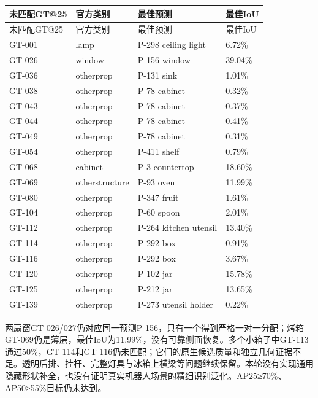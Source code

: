 \documentclass[UTF8,fontset=fandol]{ctexart}
\begin{document}
{\small
\begin{longtable}{|p{}|p{}|p{}|p{}|}
\hline
未匹配GT@25 & 官方类别 & 最佳预测 & 最佳IoU \\ \hline
\endfirsthead
\hline
未匹配GT@25 & 官方类别 & 最佳预测 & 最佳IoU \\ \hline
\endhead
GT-001 & lamp & P-298 ceiling light & 6.72\% \\ \hline
GT-026 & window & P-156 window & 39.04\% \\ \hline
GT-036 & otherprop & P-131 sink & 1.01\% \\ \hline
GT-038 & otherprop & P-78 cabinet & 0.32\% \\ \hline
GT-043 & otherprop & P-78 cabinet & 0.37\% \\ \hline
GT-044 & otherprop & P-78 cabinet & 0.41\% \\ \hline
GT-049 & otherprop & P-78 cabinet & 0.31\% \\ \hline
GT-054 & otherprop & P-411 shelf & 0.79\% \\ \hline
GT-068 & cabinet & P-3 countertop & 18.60\% \\ \hline
GT-069 & otherstructure & P-93 oven & 11.99\% \\ \hline
GT-080 & otherprop & P-347 fruit & 1.61\% \\ \hline
GT-104 & otherprop & P-60 spoon & 2.01\% \\ \hline
GT-112 & otherprop & P-264 kitchen utensil & 13.40\% \\ \hline
GT-114 & otherprop & P-292 box & 0.91\% \\ \hline
GT-116 & otherprop & P-292 box & 3.67\% \\ \hline
GT-120 & otherprop & P-102 jar & 15.78\% \\ \hline
GT-125 & otherprop & P-212 jar & 13.65\% \\ \hline
GT-139 & otherprop & P-273 utensil holder & 0.22\% \\ \hline
\end{longtable}
}

两扇窗GT-026/027仍对应同一预测P-156，只有一个得到严格一对一分配；烤箱GT-069仍是薄层，最佳IoU为11.99\%，没有可靠侧面恢复。多个小箱子中GT-113通过50\%，GT-114和GT-116仍未匹配；它们的原生候选质量和独立几何证据不足。透明后排、挂杆、完整灯具与冰箱上横梁等问题继续保留。本轮没有实现通用隐藏形状补全，也没有证明真实机器人场景的精细识别泛化。AP25≥70\%、AP50≥55\%目标仍未达到。
\end{document}

